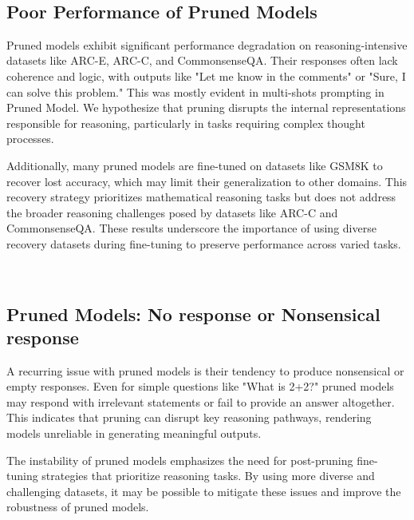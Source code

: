 

\newpage
~\newpage
~\newpage
~\newpage

\subsection{Poor Performance of Pruned Models}
\label{app: Poor Performance of Pruned Models}
Pruned models exhibit significant performance degradation on reasoning-intensive datasets like ARC-E, ARC-C, and CommonsenseQA. Their responses often lack coherence and logic, with outputs like "Let me know in the comments" or "Sure, I can solve this problem." This was mostly evident in multi-shots prompting in Pruned Model. We hypothesize that pruning disrupts the internal representations responsible for reasoning, particularly in tasks requiring complex thought processes.\medskip

Additionally, many pruned models are fine-tuned on datasets like GSM8K to recover lost accuracy, which may limit their generalization to other domains. This recovery strategy prioritizes mathematical reasoning tasks but does not address the broader reasoning challenges posed by datasets like ARC-C and CommonsenseQA. These results underscore the importance of using diverse recovery datasets during fine-tuning to preserve performance across varied tasks.



\newpage
~\newpage



\subsection{Pruned Models: No response or Nonsensical response}
A recurring issue with pruned models is their tendency to produce nonsensical or empty responses. Even for simple questions like "What is 2+2?" pruned models may respond with irrelevant statements or fail to provide an answer altogether. This indicates that pruning can disrupt key reasoning pathways, rendering models unreliable in generating meaningful outputs.\medskip

The instability of pruned models emphasizes the need for post-pruning fine-tuning strategies that prioritize reasoning tasks. By using more diverse and challenging datasets, it may be possible to mitigate these issues and improve the robustness of pruned models.



\newpage
~\newpage


